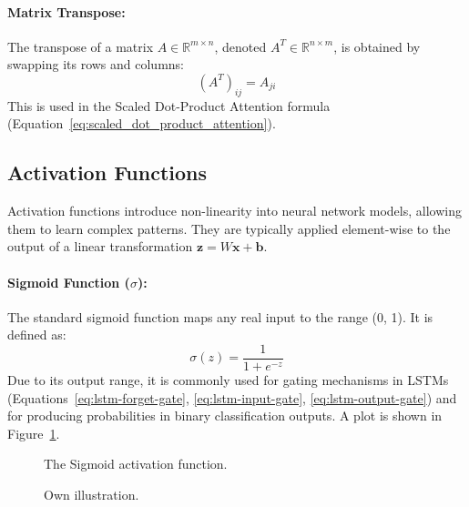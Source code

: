\begin{appendices}
  \paragraph{Matrix Transpose:}
  The transpose of a matrix \( A \in \mathbb{R}^{m \times n} \), denoted \( A^T \in \mathbb{R}^{n \times m} \), is obtained by swapping its rows and columns:
  \begin{equation}
    (A^T)_{ij} = A_{ji}
  \end{equation}
  This is used in the Scaled Dot-Product Attention formula (Equation~\ref{eq:scaled_dot_product_attention}).


  \subsection{Activation Functions}

  Activation functions introduce non-linearity into neural network models, allowing them to learn complex patterns. They are typically applied element-wise to the output of a linear transformation \( \bm{z} = W\bm{x} + \bm{b} \).

  \paragraph{Sigmoid Function (\( \sigma \)):}
  The standard sigmoid function maps any real input to the range (0, 1). It is defined as:
  \begin{equation}
    \sigma(z) = \frac{1}{1 + e^{-z}}
  \end{equation}
  Due to its output range, it is commonly used for gating mechanisms in LSTMs (Equations~\ref{eq:lstm-forget-gate}, \ref{eq:lstm-input-gate}, \ref{eq:lstm-output-gate}) and for producing probabilities in binary classification outputs. A plot is shown in Figure~\ref{fig:sigmoid_plot}.

  \begin{figure}[htbp]
    \centering
    \caption[Sigmoid activation function]{The Sigmoid activation function.}
    \label{fig:sigmoid_plot}
    \caption*{Own illustration.}
  \end{figure}



\end{appendices}
